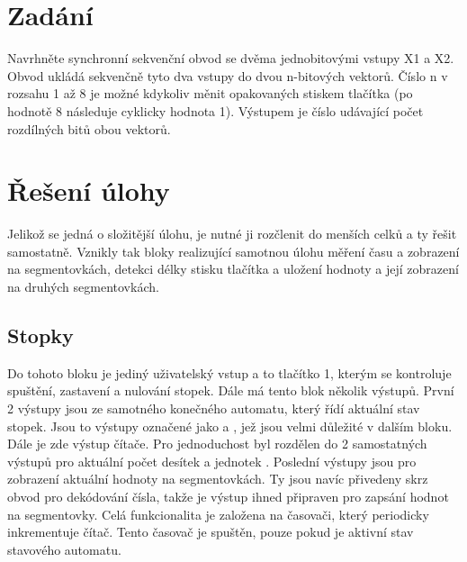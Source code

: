\documentclass[FM,ZP]{tulthesis}
\begin{document}
	\renewcommand{\baselinestretch}{1.50}
	\setlength\parindent{1.2cm}
	\selectfont
	
	\begingroup
	\renewcommand{\cleardoublepage}{}
	\renewcommand{\clearpage}{}
	\chapter{Zadání}
	\endgroup
	Navrhněte synchronní sekvenční obvod se dvěma jednobitovými vstupy X1 a X2. Obvod ukládá sekvenčně tyto dva vstupy do dvou n-bitových vektorů. Číslo n v rozsahu 1 až 8 je možné kdykoliv měnit opakovaných stiskem tlačítka (po hodnotě 8 následuje cyklicky hodnota 1). Výstupem je číslo udávající počet rozdílných bitů obou vektorů.
	
	\begingroup
	\renewcommand{\cleardoublepage}{}
	\renewcommand{\clearpage}{}
	\newpage
	\chapter{Řešení úlohy}
	\endgroup
	Jelikož se jedná o složitější úlohu, je nutné ji rozčlenit do menších celků a ty řešit samostatně. Vznikly tak bloky realizující samotnou úlohu měření času a zobrazení na segmentovkách, detekci délky stisku tlačítka a uložení hodnoty a její zobrazení na druhých segmentovkách.
	
	\section{Stopky}
	Do tohoto bloku je jediný uživatelský vstup a to tlačítko 1, kterým se kontroluje spuštění, zastavení a nulování stopek. Dále má tento blok několik výstupů. První 2 výstupy jsou ze samotného konečného automatu, který řídí aktuální stav stopek. Jsou to výstupy označené jako  a , jež jsou velmi důležité v dalším bloku. Dále je zde výstup čítače. Pro jednoduchost byl rozdělen do 2 samostatných výstupů pro aktuální počet desítek  a jednotek . Poslední výstupy jsou pro zobrazení aktuální hodnoty na segmentovkách. Ty jsou navíc přivedeny skrz obvod pro dekódování čísla, takže je výstup ihned připraven pro zapsání hodnot na segmentovky.
	Celá funkcionalita je založena na časovači, který periodicky inkrementuje čítač. Tento časovač je spuštěn, pouze pokud je aktivní stav  stavového automatu.
	
\end{document}
